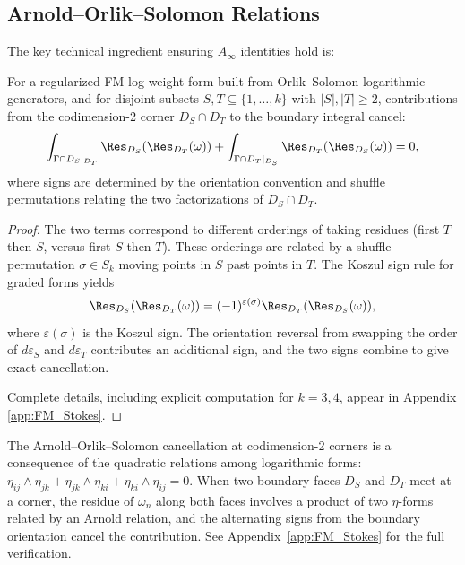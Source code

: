 \subsection{Arnold--Orlik--Solomon Relations}

The key technical ingredient ensuring $A_\infty$ identities hold is:

\begin{lemma}
\label{lem:Arnold_cancellation}
For a regularized FM-log weight form built from Orlik--Solomon
logarithmic generators, and for disjoint subsets
$S,T\subseteq\{1,\ldots,k\}$ with $|S|,|T|\geq2$, contributions from
the codimension-2 corner $D_S\cap D_T$ to the boundary integral cancel:
\[
\int_{\Gamma \cap D_S|_{D_T}} \Res_{D_S}(\Res_{D_T}(\omega)) + \int_{\Gamma \cap D_T|_{D_S}} \Res_{D_T}(\Res_{D_S}(\omega)) = 0,
\]
where signs are determined by the orientation convention and shuffle permutations relating the two factorizations of $D_S \cap D_T$.
\end{lemma}

\begin{proof}
The two terms correspond to different orderings of taking residues (first $T$ then $S$, versus first $S$ then $T$). These orderings are related by a shuffle permutation $\sigma \in S_k$ moving points in $S$ past points in $T$. The Koszul sign rule for graded forms yields
\[
\Res_{D_S}(\Res_{D_T}(\omega)) = (-1)^{\varepsilon(\sigma)} \Res_{D_T}(\Res_{D_S}(\omega)),
\]
where $\varepsilon(\sigma)$ is the Koszul sign. The orientation reversal from swapping the order of $d\varepsilon_S$ and $d\varepsilon_T$ contributes an additional sign, and the two signs combine to give exact cancellation.

Complete details, including explicit computation for $k=3,4$, appear in Appendix \ref{app:FM_Stokes}.
\end{proof}

\begin{remark}
\label{rem:AOS-mechanism}
The Arnold--Orlik--Solomon cancellation at codimension-2 corners is a consequence of the quadratic relations among logarithmic forms: $\eta_{ij} \wedge \eta_{jk} + \eta_{jk} \wedge \eta_{ki} + \eta_{ki} \wedge \eta_{ij} = 0$. When two boundary faces $D_S$ and $D_T$ meet at a corner, the residue of $\omega_n$ along both faces involves a product of two $\eta$-forms related by an Arnold relation, and the alternating signs from the boundary orientation cancel the contribution. See Appendix~\ref{app:FM_Stokes} for the full verification.
\end{remark}

